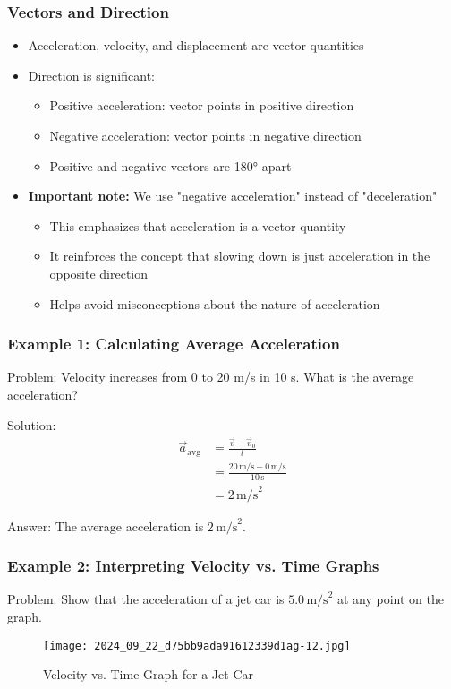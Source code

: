 \documentclass{beamer}
\begin{document}
\begin{frame}
\frametitle{Vectors and Direction}
\begin{itemize}
    \item Acceleration, velocity, and displacement are vector quantities
    \item Direction is significant:
    \begin{itemize}
        \item Positive acceleration: vector points in positive direction
        \item Negative acceleration: vector points in negative direction
        \item Positive and negative vectors are 180° apart
    \end{itemize}
    \item \textbf{Important note:} We use "negative acceleration" instead of "deceleration"
    \begin{itemize}
        \item This emphasizes that acceleration is a vector quantity
        \item It reinforces the concept that slowing down is just acceleration in the opposite direction
        \item Helps avoid misconceptions about the nature of acceleration
    \end{itemize}
\end{itemize}
\end{frame}

\begin{frame}
\frametitle{Example 1: Calculating Average Acceleration}
Problem: Velocity increases from 0 to 20 m/s in 10 s. What is the average acceleration?

Solution:
\begin{align*}
\vec{a}_{\text{avg}} &= \frac{\vec{v} - \vec{v}_0}{t} \\
&= \frac{20 \, \text{m/s} - 0 \, \text{m/s}}{10 \, \text{s}} \\
&= 2 \, \text{m/s}^2
\end{align*}

Answer: The average acceleration is $2 \, \text{m/s}^2$.
\end{frame}

\begin{frame}
\frametitle{Example 2: Interpreting Velocity vs. Time Graphs}
Problem: Show that the acceleration of a jet car is $5.0 \, \text{m/s}^2$ at any point on the graph.

\begin{figure}[H]
    \centering
    \texttt{[image: 2024\_09\_22\_d75bb9ada91612339d1ag-12.jpg]}
\caption{Velocity vs. Time Graph for a Jet Car}
\end{figure}

\end{frame}
\end{document}
